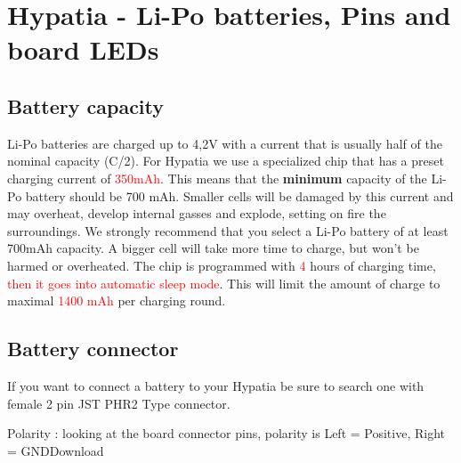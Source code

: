 %
%
%



\chapter{Hypatia  - Li-Po batteries, Pins and board LEDs}

\section{Battery capacity}

Li-Po batteries are charged up to 4,2V with a current that is usually half of the nominal capacity (C/2). For Hypatia  we use a specialized chip that has a preset charging current of \textcolor{red}{350mAh}. This means that the \textbf{minimum} capacity of the Li-Po battery should be 700 mAh. Smaller cells will be damaged by this current and may overheat, develop internal gasses and explode, setting on fire the surroundings. We strongly recommend that you select a Li-Po battery of at least 700mAh capacity. A bigger cell will take more
time to charge, but won't be harmed or overheated. The chip is programmed with \textcolor{red}{4} hours of charging time, \textcolor{red}{then it goes into automatic sleep mode}. This will limit the amount of charge to maximal \textcolor{red}{1400 mAh} per charging round.

\section{Battery connector}

If you want to connect a battery to your Hypatia be sure to search one with female 2 pin JST PHR2 Type connector.

\medskip

Polarity : looking at the board connector pins, polarity is Left = Positive, Right = GNDDownload


\medskip

